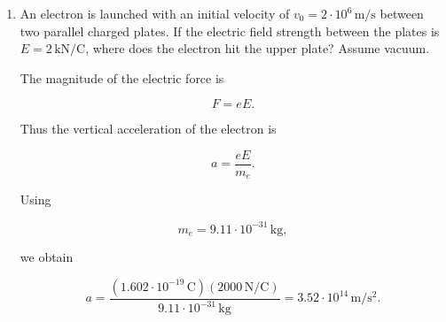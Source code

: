 \documentclass[a4paper,12pt]{letter}
\begin{document}
\begin{enumerate}
and the acceleration is approximately

$$\boxed{9.78\cdot10^8}$$

times greater than the acceleration due to gravity.



\newpage
\item An electron is launched with an initial velocity of $v_0 = 2\cdot10^6\,\mathrm{m/s}$ between two parallel charged plates. If the electric field strength between the plates is $E = 2\,\mathrm{kN/C}$, where does the electron hit the upper plate? Assume vacuum.

\begin{center}
\end{center}

The magnitude of the electric force is

$$F=eE.$$

Thus the vertical acceleration of the electron is

$$a=\frac{eE}{m_e}.$$

Using

$$m_e=9.11\cdot10^{-31}\,\mathrm{kg},$$

we obtain

$$a=\frac{(1.602\cdot10^{-19}\,\mathrm{C})(2000\,\mathrm{N/C})}{9.11\cdot10^{-31}\,\mathrm{kg}}=3.52\cdot10^{14}\,\mathrm{m/s^2}.$$


\end{enumerate}
\end{document}

